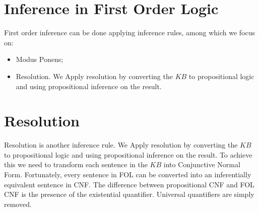\documentclass{article}
\begin{document}
\newpage

\section{Inference in First Order Logic}

First order inference can be done applying inference rules, among which we focus on:
\begin{itemize}
    \item Modus Ponens;
    \item Resolution. We Apply resolution by converting the $KB$ to propositional logic and using propositional inference on the result.
\end{itemize}
 
\section{Resolution}

Resolution is another inference rule. We Apply resolution by converting the $KB$ to propositional logic and using propositional inference on the result. To achieve this we need to transform each sentence in the $KB$ into Conjunctive Normal Form. Fortunately, every sentence in FOL can be converted into an inferentially equivalent sentence in CNF. The difference between propositional CNF and FOL CNF is the presence of the existential quantifier. Universal quantifiers are simply removed.
\end{document}
